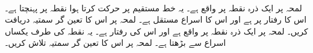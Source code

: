 \\
لمحہ  پر ایک ذرہ نقطہ  پر واقع ہے۔ یہ خط مستقیم پر حرکت کرتا ہوا نقطہ  پر  پہنچتا ہے۔ اس کا رفتار  پر  ہے  اور  اس کا اسراع مستقل  ہے۔ لمحہ  پر اس کا تعین گر سمتیہ  دریافت کریں۔
لمحہ  پر ایک ذرہ نقطہ  پر واقع ہے  اور  اس کی  رفتار  ہے۔ یہ نقطہ  کی طرف یکساں اسراع  سے بڑھتا ہے۔ لمحہ  پر اس کا تعین گر سمتیہ  تلاش کریں۔

